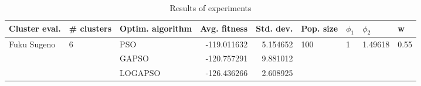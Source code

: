 \begin{table}
\centering
\caption{Results of experiments}
\begin{tabular}{lllrrllll}
\toprule
               Cluster eval. &        \# clusters & Optim. algorithm &  Avg. fitness &  Std. dev. &            Pop. size &         $\phi_{1}$ &               $\phi_{2}$ &                     w \\
\midrule
\multirow{3}{*}{Fuku Sugeno} & \multirow{3}{*}{6} &              PSO &   -119.011632 &   5.154652 & \multirow{3}{*}{100} & \multirow{3}{*}{1} & \multirow{3}{*}{1.49618} & \multirow{3}{*}{0.55} \\
                             &                    &            GAPSO &   -120.757291 &   9.881012 &                      &                    &                          &                       \\
                             &                    &          LOGAPSO &   -126.436266 &   2.608925 &                      &                    &                          &                       \\
\bottomrule
\end{tabular}
\end{table}
